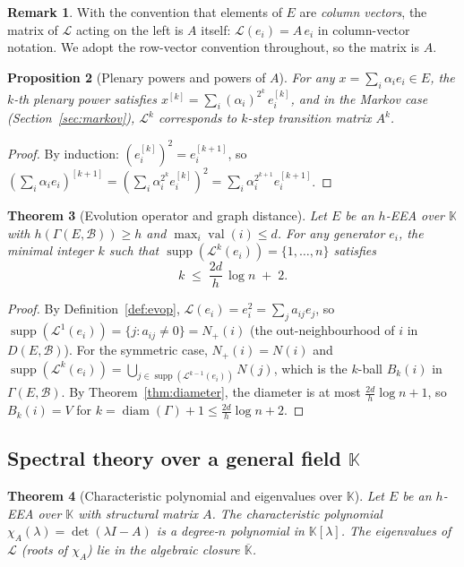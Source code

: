 \documentclass[12pt,a4paper]{amsart}
\newtheorem{theorem}{Theorem}[section]
\newtheorem{proposition}[theorem]{Proposition}
\theoremstyle{definition}
\newtheorem{remark}[theorem]{Remark}
\DeclareMathOperator{\val}{val}
\DeclareMathOperator{\diam}{diam}
\DeclareMathOperator{\supp}{supp}
\newcommand{\K}{\mathbb{K}}
\newcommand{\hh}{h}          %
\newcommand{\EA}{E}          %
\newcommand{\natbasis}{\mathcal{B}}  %
\newcommand{\strmat}{A}      %
\newcommand{\evop}{\mathcal{L}} %
\begin{document}
\begin{remark}
With the convention that elements of $\EA$ are \emph{column vectors},
the matrix of $\evop$ acting on the left is $\strmat$ itself:
$\evop(e_i) = \strmat\,e_i$ in column-vector notation.  We adopt the
row-vector convention throughout, so the matrix is $\strmat$.
\end{remark}

\begin{proposition}[Plenary powers and powers of $\strmat$]\label{prop:powers}
For any $x=\sum_i \alpha_i e_i\in\EA$, the $k$-th plenary power
satisfies $x^{[k]}=\sum_i (\alpha_i)^{2^k}\,e_i^{[k]}$, and in
the Markov case (Section~\ref{sec:markov}), $\evop^k$ corresponds to
$k$-step transition matrix $\strmat^k$.
\end{proposition}

\begin{proof}
By induction: $(e_i^{[k]})^2=e_i^{[k+1]}$, so
$(\sum_i\alpha_i e_i)^{[k+1]}=(\sum_i\alpha_i^{2^k}e_i^{[k]})^2
=\sum_i\alpha_i^{2^{k+1}}e_i^{[k+1]}$.
\end{proof}

\begin{theorem}[Evolution operator and graph distance]\label{thm:evop-distance}
Let $\EA$ be an $h$-EEA over $\K$ with $\hh(\varGamma(\EA,\natbasis))
\ge h$ and $\max_i\val(i)\le d$.  For any generator $e_i$, the
minimal integer $k$ such that $\supp(\evop^k(e_i))=\{1,\ldots,n\}$
satisfies
\[
  k \;\le\; \frac{2d}{h}\,\log n \;+\; 2.
\]
\end{theorem}

\begin{proof}
By Definition~\ref{def:evop}, $\evop(e_i)=e_i^2=\sum_j a_{ij}e_j$, so
$\supp(\evop^1(e_i))=\{j: a_{ij}\ne 0\}=N_+(i)$ (the out-neighbourhood
of $i$ in $D(\EA,\natbasis)$).  For the symmetric case, $N_+(i)=N(i)$
and $\supp(\evop^k(e_i))=\bigcup_{j\in\supp(\evop^{k-1}(e_i))} N(j)$,
which is the $k$-ball $B_k(i)$ in $\varGamma(\EA,\natbasis)$.  By
Theorem~\ref{thm:diameter}, the diameter is at most $\frac{2d}{h}\log n+1$,
so $B_k(i)=V$ for $k=\diam(\varGamma)+1\le\frac{2d}{h}\log n+2$.
\end{proof}

\subsection{Spectral theory over a general field $\K$}

\begin{theorem}[Characteristic polynomial and eigenvalues over $\K$]\label{thm:char-poly}
Let $\EA$ be an $h$-EEA over $\K$ with structural matrix $\strmat$.
The characteristic polynomial $\chi_\strmat(\lambda)=\det(\lambda I-\strmat)$
is a degree-$n$ polynomial in $\K[\lambda]$.  The eigenvalues of
$\evop$ (roots of $\chi_\strmat$) lie in the algebraic closure
$\overline{\K}$.
\end{theorem}
\end{document}
